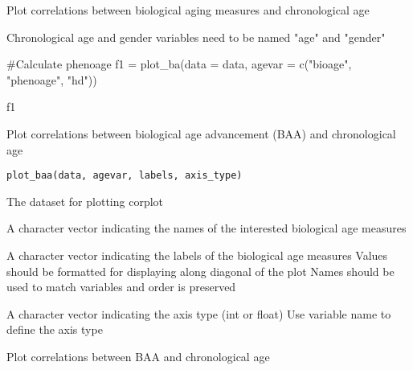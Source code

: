 \documentclass[a4paper]{book}
\begin{document}
%
\begin{Details}\relax
Plot correlations between biological aging measures and chronological age
\end{Details}
%
\begin{Note}\relax
Chronological age and gender variables need to be named "age" and "gender"
\end{Note}
%
\begin{Examples}
\begin{ExampleCode}
#Calculate phenoage
f1 = plot_ba(data = data, agevar = c("bioage", "phenoage", "hd"))

f1

\end{ExampleCode}
\end{Examples}
%
\begin{Description}\relax
Plot correlations between biological age advancement (BAA) and chronological age
\end{Description}
%
\begin{Usage}
\begin{verbatim}
plot_baa(data, agevar, labels, axis_type)
\end{verbatim}
\end{Usage}
%
\begin{Arguments}
\begin{ldescription}
\item[\code{data}] The dataset for plotting corplot

\item[\code{agevar}] A character vector indicating the names of the interested biological age measures

\item[\code{labels}] A character vector indicating the labels of the biological age measures
Values should be formatted for displaying along diagonal of the plot
Names should be used to match variables and order is preserved

\item[\code{axis\_type}] A character vector indicating the axis type (int or float)
Use variable name to define the axis type
\end{ldescription}
\end{Arguments}
%
\begin{Details}\relax
Plot correlations between BAA and chronological age
\end{Details}
%
\end{document}
